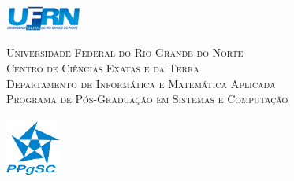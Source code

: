 \newenvironment{epigrafe}[1][\epigrafenome]{%
	\begin{center}
		{\Huge \bfseries \epigrafenome} %
	\end{center}
}


\newcommand{\imprimircapa}{%
	\begin{titlepage}
		\begin{center}
			
			\begin{minipage}{2.5cm}
				\begin{center}
					\includegraphics[width=2.5cm]{imagens/logos/logo_UFRN.png}
				\end{center}
			\end{minipage}
			\begin{minipage}{11cm}
				\begin{center}
					\begin{singlespace}
						{\small \textsc{Universidade Federal do Rio Grande do Norte}
							\\
							\textsc{Centro de Ciências Exatas e da Terra}
							\\
							\textsc{Departamento de Informática e Matemática Aplicada}
							\\
							\textsc{Programa de Pós-Graduação em Sistemas e Computação}
							\\
							\iftoggle{PPgSC-Tese}
								{\textsc{Doutorado Acadêmico em Ciência da Computação}}
								{\textsc{Mestrado Acadêmico em Sistemas e Computação}}
						}
					\end{singlespace}
				\end{center}
			\end{minipage}
			\begin{minipage}{1.8cm}
				\begin{center}
					\includegraphics[width=1.8cm, height=2cm]{imagens/logos/logo-ppgsc.png}
				\end{center}
			\end{minipage}
			

\end{center}
\end{titlepage}}
